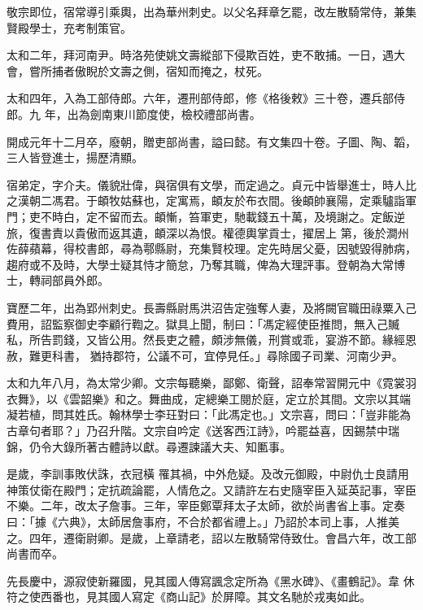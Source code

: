 \begin{pinyinscope}
 敬宗即位，宿常導引乘輿，出為華州刺史。以父名拜章乞罷，改左散騎常侍，兼集賢殿學士，充考制策官。



 太和二年，拜河南尹。時洛苑使姚文壽縱部下侵欺百姓，吏不敢捕。一日，遇大會，嘗所捕者傲睨於文壽之側，宿知而掩之，杖死。



 太和四年，入為工部侍郎。六年，遷刑部侍郎，修《格後敕》三十卷，遷兵部侍郎。九
 年，出為劍南東川節度使，檢校禮部尚書。



 開成元年十二月卒，廢朝，贈吏部尚書，謚曰懿。有文集四十卷。子圖、陶、韜，三人皆登進士，揚歷清顯。



 宿弟定，字介夫。儀貌壯偉，與宿俱有文學，而定過之。貞元中皆舉進士，時人比之漢朝二馮君。于頔牧姑蘇也，定寓焉，頔友於布衣間。後頔帥襄陽，定乘驢詣軍門；吏不時白，定不留而去。頔慚，笞軍吏，馳載錢五十萬，及境謝之。定飯逆旅，復書責以貴傲而返其遺，頔深以為恨。權德輿掌貢士，擢居上
 第，後於澗州佐薛蘋幕，得校書郎，尋為鄠縣尉，充集賢校理。定先時居父憂，因號毀得肺病，趨府或不及時，大學士疑其恃才簡怠，乃奪其職，俾為大理評事。登朝為大常博士，轉祠部員外郎。



 寶歷二年，出為郢州刺史。長壽縣尉馬洪沼告定強奪人妻，及將闕官職田祿粟入己費用，詔監察御史李顧行鞫之。獄具上聞，制曰：「馮定經使臣推問，無入己贓私，所告罰錢，又皆公用。然長吏之體，頗涉無儀，刑賞或乖，宴游不節。緣經恩赦，難更科書，
 猶持郡符，公議不可，宜停見任。」尋除國子司業、河南少尹。



 太和九年八月，為太常少卿。文宗每聽樂，鄙鄭、衛聲，詔奉常習開元中《霓裳羽衣舞》，以《雲韶樂》和之。舞曲成，定總樂工閱於庭，定立於其間。文宗以其端凝若植，問其姓氏。翰林學士李玨對曰：「此馮定也。」文宗喜，問曰：「豈非能為古章句者耶？」乃召升階。文宗自吟定《送客西江詩》，吟罷益喜，因錫禁中瑞錦，仍令大錄所著古體詩以獻。尋遷諫議大夫、知匭事。



 是歲，李訓事敗伏誅，衣冠橫
 罹其禍，中外危疑。及改元御殿，中尉仇士良請用神策仗衛在殿門；定抗疏論罷，人情危之。又請許左右史隨宰臣入延英記事，宰臣不樂。二年，改太子詹事。三年，宰臣鄭覃拜太子太師，欲於尚書省上事。定奏曰：「據《六典》，太師居詹事府，不合於都省禮上。」乃詔於本司上事，人推美之。四年，遷衛尉卿。是歲，上章請老，詔以左散騎常侍致仕。會昌六年，改工部尚書而卒。



 先長慶中，源寂使新羅國，見其國人傳寫諷念定所為《黑水碑》、《畫鶴記》。韋
 休符之使西番也，見其國人寫定《商山記》於屏障。其文名馳於戎夷如此。




\end{pinyinscope}
